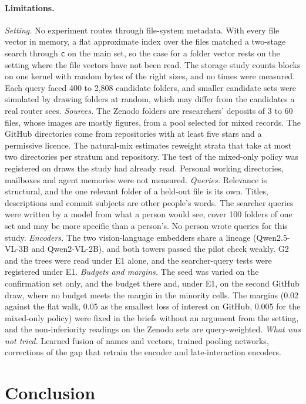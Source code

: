 \documentclass[sigconf,natbib=true,anonymous=true]{acmart}
\newcommand{\rep}[1]{\texttt{#1}}
\begin{document}
\paragraph{Limitations.} \emph{Setting.} No experiment routes through file-system metadata. With every file vector in memory, a flat approximate index over the files matched a two-stage search through \rep{c} on the main set, so the case for a folder vector rests on the setting where the file vectors have not been read. The storage study counts blocks on one kernel with random bytes of the right sizes, and no times were measured. Each query faced 400 to 2,808 candidate folders, and smaller candidate sets were simulated by drawing folders at random, which may differ from the candidates a real router sees. \emph{Sources.} The Zenodo folders are researchers' deposits of 3 to 60 files, whose images are mostly figures, from a pool selected for mixed records. The GitHub directories come from repositories with at least five stars and a permissive licence. The natural-mix estimates reweight strata that take at most two directories per stratum and repository. The test of the mixed-only policy was registered on draws the study had already read. Personal working directories, mailboxes and agent memories were not measured. \emph{Queries.} Relevance is structural, and the one relevant folder of a held-out file is its own. Titles, descriptions and commit subjects are other people's words. The searcher queries were written by a model from what a person would see, cover 100 folders of one set and may be more specific than a person's. No person wrote queries for this study. \emph{Encoders.} The two vision-language embedders share a lineage (Qwen2.5-VL-3B and Qwen2-VL-2B), and both towers passed the pilot check weakly. G2 and the trees were read under E1 alone, and the searcher-query tests were registered under E1. \emph{Budgets and margins.} The seed was varied on the confirmation set only, and the budget there and, under E1, on the second GitHub draw, where no budget meets the margin in the minority cells. The margins (0.02 against the flat walk, 0.05 as the smallest loss of interest on GitHub, 0.005 for the mixed-only policy) were fixed in the briefs without an argument from the setting, and the non-inferiority readings on the Zenodo sets are query-weighted. \emph{What was not tried.} Learned fusion of names and vectors, trained pooling networks, corrections of the gap that retrain the encoder and late-interaction encoders.

\section{Conclusion}
\end{document}
